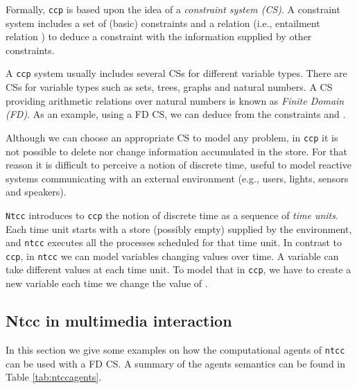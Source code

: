\documentclass[english]{llncs}
\begin{document}
Formally, \texttt{ccp} is based upon the idea of a \textit{constraint system (CS)}. A constraint system includes a set of (basic) constraints and a relation (i.e., entailment relation ) to deduce a constraint with the information supplied by other constraints.

A \texttt{ccp} system usually includes several CSs for different variable types. 
 There are CSs for variable types such as sets, trees, graphs and natural numbers. A CS providing arithmetic relations over natural numbers is known as \textit{Finite Domain (FD)}. As an example, using a FD CS, we can deduce  from the constraints  and . 


Although we can choose an appropriate CS to model any problem, 
in \texttt{ccp} it is not possible to delete nor change information accumulated in the store. For that reason it is difficult to perceive a notion of discrete time, useful to model reactive systems communicating with an external environment (e.g., users, lights, sensors and speakers).


\texttt{Ntcc} introduces to \texttt{ccp} the notion of discrete time as a sequence of \textit{time units}. Each time unit starts with a store  (possibly empty) supplied by the environment, and \texttt{ntcc} executes all the processes scheduled for that time unit.
In contrast to \texttt{ccp}, in \texttt{ntcc} we can model variables changing values over time. A variable  can take different values at each time unit. To model that
in \texttt{ccp}, we have to create a new variable  each time we change the value of .




\subsection{Ntcc in multimedia interaction}

In this section we give some examples on how the computational agents of \texttt{ntcc} can be used with a FD CS.
A summary of the agents semantics can be found in Table \ref{tab:ntccagents}.
\end{document}
